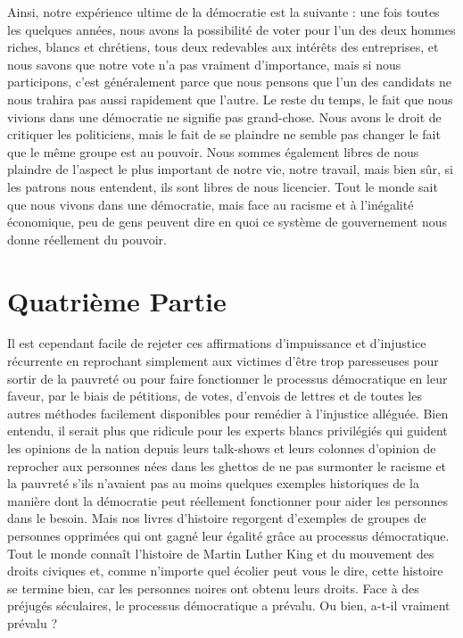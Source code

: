 Ainsi, notre expérience ultime de la démocratie est la suivante : une fois toutes les quelques années, nous avons la possibilité de voter pour l'un des deux hommes riches, blancs et chrétiens, tous deux redevables aux intérêts des entreprises, et nous savons que notre vote n'a pas vraiment d'importance, mais si nous participons, c'est généralement parce que nous pensons que l'un des candidats ne nous trahira pas aussi rapidement que l'autre. Le reste du temps, le fait que nous vivions dans une démocratie ne signifie pas grand-chose. Nous avons le droit de critiquer les politiciens, mais le fait de se plaindre ne semble pas changer le fait que le même groupe est au pouvoir. Nous sommes également libres de nous plaindre de l'aspect le plus important de notre vie, notre travail, mais bien sûr, si les patrons nous entendent, ils sont libres de nous licencier. Tout le monde sait que nous vivons dans une démocratie, mais face au racisme et à l'inégalité économique, peu de gens peuvent dire en quoi ce système de gouvernement nous donne réellement du pouvoir.

\chapter*{\textbf{Quatrième Partie}}\hypertarget{quatrime-partie}{}\label{quatrime-partie}

Il est cependant facile de rejeter ces affirmations d'impuissance et d'injustice récurrente en reprochant simplement aux victimes d'être trop paresseuses pour sortir de la pauvreté ou pour faire fonctionner le processus démocratique en leur faveur, par le biais de pétitions, de votes, d'envois de lettres et de toutes les autres méthodes facilement disponibles pour remédier à l'injustice alléguée. Bien entendu, il serait plus que ridicule pour les experts blancs privilégiés qui guident les opinions de la nation depuis leurs talk-shows et leurs colonnes d'opinion de reprocher aux personnes nées dans les ghettos de ne pas surmonter le racisme et la pauvreté s'ils n'avaient pas au moins quelques exemples historiques de la manière dont la démocratie peut réellement fonctionner pour aider les personnes dans le besoin. Mais nos livres d'histoire regorgent d'exemples de groupes de personnes opprimées qui ont gagné leur égalité grâce au processus démocratique. Tout le monde connaît l'histoire de Martin Luther King et du mouvement des droits civiques et, comme n'importe quel écolier peut vous le dire, cette histoire se termine bien, car les personnes noires ont obtenu leurs droits. Face à des préjugés séculaires, le processus démocratique a prévalu. Ou bien, a-t-il vraiment prévalu ?

